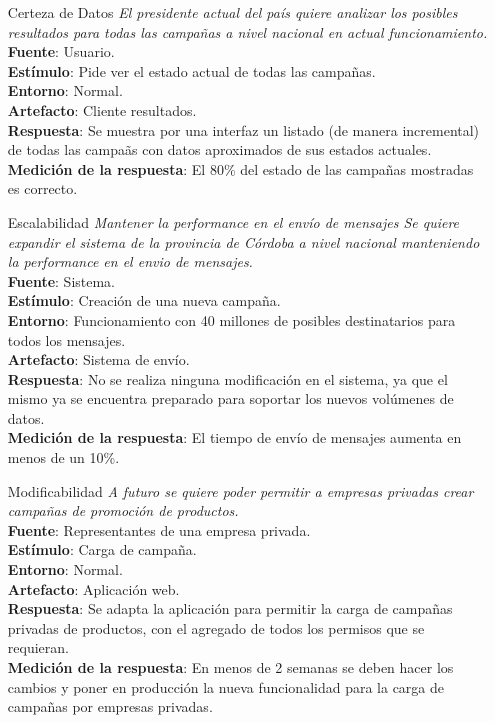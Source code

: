 \documentclass[a4paper, 11pt]{article}
\begin{document}
\begin{itemize}
\item[Certeza de Datos] \textit{El presidente actual del país quiere analizar los posibles resultados para todas las campañas a nivel nacional en actual funcionamiento.}\\
\textbf{Fuente}: Usuario. \\
\textbf{Estímulo}: Pide ver el estado actual de todas las campa\~nas. \\
\textbf{Entorno}: Normal. \\
\textbf{Artefacto}: Cliente resultados. \\
\textbf{Respuesta}: Se muestra por una interfaz un listado (de manera incremental) de todas las campa\~as con datos aproximados de sus estados actuales. \\
\textbf{Medición de la respuesta}: El 80\% del estado de las campa\~nas mostradas es correcto. \\

\item[Escalabilidad] \textit{Mantener la performance en el envío de mensajes
Se quiere expandir el sistema de la provincia de Córdoba a nivel nacional manteniendo la performance en el envio de mensajes.}\\
\textbf{Fuente}: Sistema. \\
\textbf{Estímulo}: Creación de una nueva campaña. \\
\textbf{Entorno}: Funcionamiento con 40 millones de posibles destinatarios para todos los mensajes. \\
\textbf{Artefacto}: Sistema de envío. \\
\textbf{Respuesta}: No se realiza ninguna modificación en el sistema, ya que el mismo ya se encuentra preparado para soportar los nuevos volúmenes de datos. \\
\textbf{Medición de la respuesta}: El tiempo de envío de mensajes aumenta en menos de un 10\%.\\

\item[Modificabilidad] \textit{A futuro se quiere poder permitir a empresas privadas crear campañas de promoción de productos.}\\
\textbf{Fuente}: Representantes de una empresa privada. \\
\textbf{Estímulo}: Carga de campaña. \\
\textbf{Entorno}: Normal. \\
\textbf{Artefacto}: Aplicación web. \\
\textbf{Respuesta}: Se adapta la aplicación para permitir la carga de campañas privadas de productos, con el agregado de todos los permisos que se requieran. \\
\textbf{Medición de la respuesta}: En menos de 2 semanas se deben hacer los cambios y poner en producción la nueva funcionalidad para la carga de campañas por empresas privadas. \\


\end{itemize}
\end{document}
